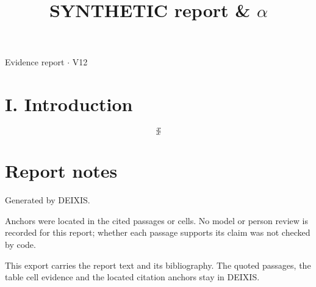\documentclass[journal]{IEEEtran}
\begin{document}
\title{SYNTHETIC report \& \ensuremath{\alpha}}

\maketitle

\noindent Evidence report \ensuremath{\cdot} V12

\section*{I. Introduction}

\begin{equation}
\label{eq:EQ1}
x
\end{equation}
\cite{Synth26}
\begin{equation*}
x
\end{equation*}
\cite{Synth26}

\section*{Report notes}

Generated by DEIXIS.

Anchors were located in the cited passages or cells. No model or person review is recorded for this report; whether each passage supports its claim was not checked by code.

This export carries the report text and its bibliography. The quoted passages, the table cell evidence and the located citation anchors stay in DEIXIS.




\end{document}
